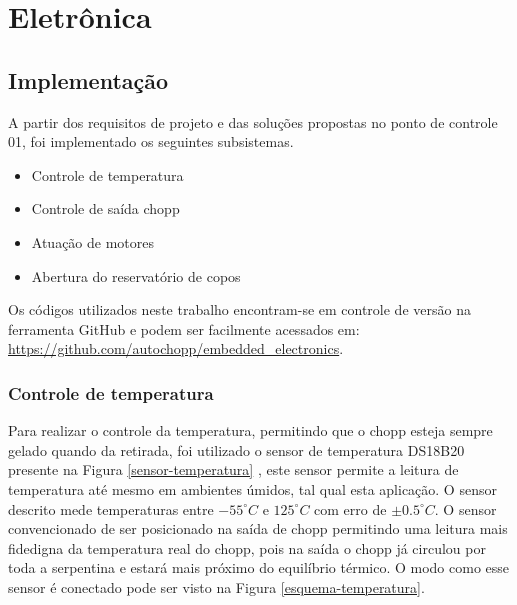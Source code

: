 \chapter[Eletrônica]{Eletrônica}

\section{Implementação}
A partir dos requisitos de projeto e das soluções propostas no ponto de controle 01, foi implementado os seguintes subsistemas. 
\begin{itemize}
\item Controle de temperatura
\item Controle de saída chopp
\item Atuação de motores
\item Abertura do reservatório de copos

\end{itemize}
  
  Os códigos utilizados neste trabalho encontram-se em controle de versão na ferramenta GitHub e podem ser facilmente acessados em: \url{https://github.com/autochopp/embedded_electronics}. 

\subsection{Controle de temperatura}
	Para realizar o controle da temperatura, permitindo que o chopp esteja sempre gelado quando da retirada, foi utilizado o sensor de temperatura DS18B20 presente na Figura \ref{sensor-temperatura} , este sensor permite a leitura de temperatura até mesmo em ambientes úmidos, tal qual esta aplicação. O sensor descrito mede temperaturas entre   $ -55 ^\circ C$ e $125 ^\circ C$ com erro de $\pm 0.5 ^\circ C$. O sensor convencionado de ser posicionado na saída de chopp permitindo uma leitura mais fidedigna da temperatura real do chopp, pois na saída o chopp já circulou por toda a serpentina e estará mais próximo do equilíbrio térmico. O modo como esse sensor é conectado pode ser visto na Figura \ref{esquema-temperatura}.

